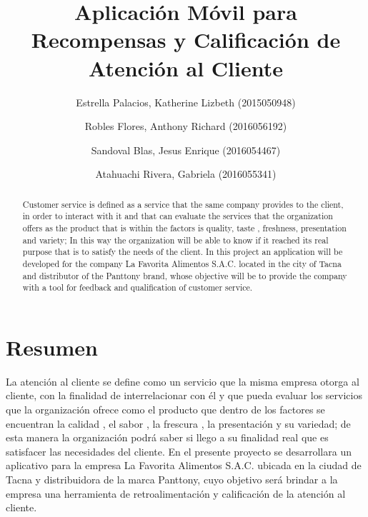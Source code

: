 \documentclass[preprint,12pt]{elsarticle}
\begin{document}
	
	\begin{frontmatter}

		\title{\huge  Aplicación Móvil para Recompensas y Calificación de Atención al Cliente}
		
		\author{Estrella Palacios, Katherine Lizbeth      (2015050948)}		
		\author{Robles Flores, Anthony Richard	(2016056192)}
		\author{Sandoval Blas, Jesus Enrique           	(2016054467)}
		\author{Atahuachi Rivera, Gabriela            	(2016055341)}
		
		\address{Tacna, Perú}
		
		\begin{abstract}
Customer service is defined as a service that the same company provides to the client, in order to interact with it and that can evaluate the services that the organization offers as the product that is within the factors is quality, taste , freshness, presentation and variety; In this way the organization will be able to know if it reached its real purpose that is to satisfy the needs of the client. In this project an application will be developed for the company La Favorita Alimentos S.A.C. located in the city of Tacna and distributor of the Panttony brand, whose objective will be to provide the company with a tool for feedback and qualification of customer service.
		\end{abstract}
\end{frontmatter}

\section{Resumen}
La atención al cliente se define como un servicio que la misma empresa otorga al cliente, con la finalidad de interrelacionar con él y que pueda evaluar los servicios que la organización ofrece como el producto que dentro de los factores se encuentran la calidad , el sabor , la frescura , la presentación y su variedad; de esta  manera la organización podrá saber si llego a su finalidad real que es satisfacer las necesidades del cliente. En el presente proyecto se desarrollara un aplicativo para la empresa La Favorita Alimentos S.A.C. ubicada en la ciudad de Tacna y distribuidora de la marca Panttony, cuyo objetivo será brindar a la empresa una herramienta de retroalimentación y calificación de la atención al cliente.
\end{document}
